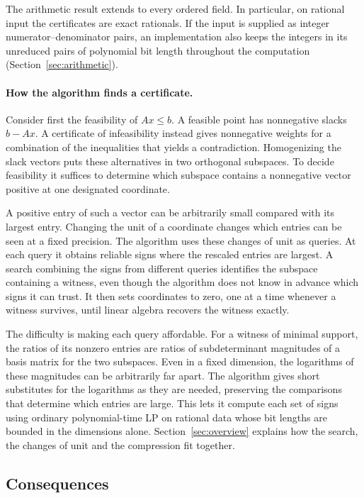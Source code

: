 The arithmetic result extends to every ordered field. In particular, on
rational input the certificates are exact rationals. If the input is supplied
as integer numerator--denominator pairs, an implementation also keeps the
integers in its unreduced pairs of polynomial bit length throughout the
computation (Section~\ref{sec:arithmetic}).

\paragraph{How the algorithm finds a certificate.}
Consider first the feasibility of \(Ax\le b\). A feasible point has
nonnegative slacks \(b-Ax\). A certificate of infeasibility instead gives
nonnegative weights for a combination of the inequalities that yields a
contradiction. Homogenizing the slack vectors puts these alternatives in
two orthogonal subspaces. To decide feasibility it suffices to determine
which subspace contains a nonnegative vector positive at one designated
coordinate.

A positive entry of such a vector can be arbitrarily small compared with its
largest entry. Changing the unit of a coordinate changes which entries can be
seen at a fixed precision. The algorithm uses these changes of unit as
queries. At each query it obtains reliable signs where the rescaled entries
are largest. A search combining the signs from different queries identifies
the subspace containing a witness, even though the algorithm does not know
in advance which signs it can trust. It then sets coordinates to zero, one
at a time whenever a witness survives, until linear algebra recovers the
witness exactly.

The difficulty is making each query affordable. For a witness of minimal support,
the ratios of its nonzero entries are ratios of subdeterminant magnitudes
of a basis matrix for the two subspaces. Even in a fixed dimension, the
logarithms of these magnitudes can be arbitrarily far apart.
The algorithm gives short substitutes for the logarithms as they are
needed, preserving the comparisons that determine which entries are large.
This lets it compute each set of signs using ordinary polynomial-time LP
on rational data whose bit lengths are bounded in the dimensions alone.
Section~\ref{sec:overview} explains how the search, the changes of unit and
the compression fit together.

\subsection{Consequences}

